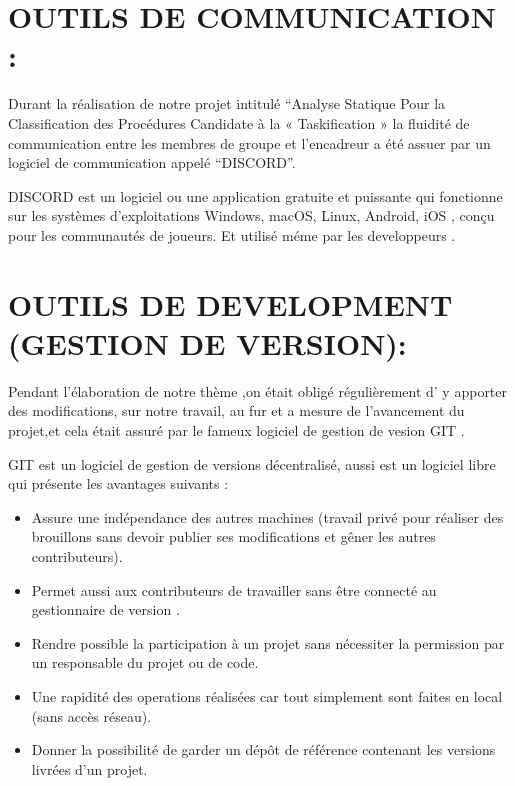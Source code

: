 \documentclass[12pt,titlepage]{article}
\begin{document}
 




\section{OUTILS DE COMMUNICATION :}


Durant la réalisation de notre projet intitulé “Analyse Statique Pour la Classification des Procédures Candidate à la « Taskification » la fluidité de communication entre les membres de groupe et l’encadreur a été assuer par un logiciel de communication appelé “DISCORD”.

DISCORD est un logiciel ou une application gratuite et puissante  qui  fonctionne sur les systèmes d’exploitations Windows, macOS, Linux, Android, iOS , conçu pour les communautés de joueurs. Et utilisé méme par les developpeurs .

\section{OUTILS DE DEVELOPMENT (GESTION DE VERSION):}



Pendant l’élaboration de notre thème ,on était obligé régulièrement d’ y apporter des modifications, sur notre travail, au fur et a mesure de l’avancement du projet,et cela était assuré par le fameux logiciel de gestion de vesion GIT .

GIT est un logiciel de gestion de versions décentralisé, aussi est un logiciel libre qui présente les avantages suivants :
\begin{itemize}



            \item Assure une indépendance des autres machines (travail privé pour réaliser des brouillons sans devoir publier ses modifications et gêner les autres contributeurs).
      \item Permet aussi aux contributeurs de travailler sans être connecté au gestionnaire de version .
      \item Rendre possible  la participation à un projet sans nécessiter la permission par un responsable du projet ou de code.
      \item Une rapidité des operations réalisées car tout simplement sont faites en local (sans accès réseau).
      \item Donner la possibilité de garder un dépôt de référence contenant les versions livrées d'un projet.

 \end{itemize}


\pagebreak 

\nocite{*} 


\end{document}
